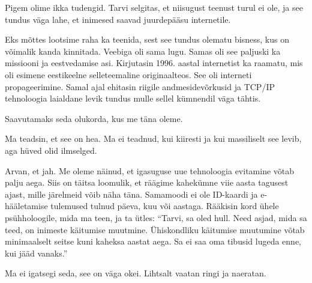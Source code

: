 
Pigem olime ikka tudengid. Tarvi selgitas, et niisugust teenust turul ei ole, ja see 
tundus väga lahe, et inimesed saavad juurdepääsu internetile. 


Eks mõttes lootsime raha ka teenida, sest see tundus olematu bisness, 
kus on võimalik kanda kinnitada. Veebiga oli sama lugu. Samas oli see 
paljuski ka missiooni ja eestvedamise asi. Kirjutasin 1996. aastal internetist ka raamatu, mis oli esimene eestikeelne 
selleteemaline originaalteos. See oli interneti propageerimine. Samal ajal 
ehitasin riigile andmesidevõrkusid ja TCP/IP 
tehnoloogia laialdane levik tundus mulle sellel kümnendil väga tähtis.


Saavutamaks seda olukorda, kus me täna oleme. 


Ma teadsin, et see on hea. Ma ei teadnud, kui kiiresti ja kui massiliselt see levib, aga 
hüved olid ilmselged. 


Arvan, et jah. Me oleme näinud, et igasuguse uue tehnoloogia evitamine 
võtab palju aega. Siis on täitsa loomulik, et räägime kahekümne viie aasta tagusest ajast, mille järelmeid võib näha täna. Samamoodi
ei ole ID-kaardi ja e-hääletamise tulemused tulnud 
päeva, kuu või aastaga. Rääkisin kord 
ühele psühholoogile, mida ma teen, ja ta ütles: \enquote{Tarvi, sa oled 
hull. Need asjad, mida sa teed, on inimeste käitumise muutmine. Ühiskondliku 
käitumise muutumine võtab minimaalselt seitse kuni kaheksa aastat aega. Sa ei 
saa oma tibusid lugeda enne, kui jääd vanaks.}


Ma ei igatsegi seda, see on väga okei. Lihtsalt vaatan 
ringi ja naeratan. 


